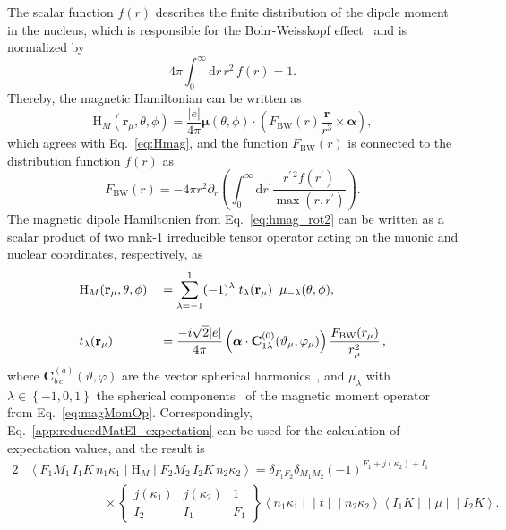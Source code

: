The scalar function $f(r)$ describes the finite distribution of the dipole moment in the nucleus, which is responsible for the Bohr-Weisskopf effect~\cite{bohrWeisskopf1950} and is normalized by
\begin{equation}
4\pi\int_0^\infty \text{d}r\,r^2\,f(r)=1.
\end{equation}
Thereby, the magnetic Hamiltonian can be written as
\begin{equation}
\label{eq:hmag_rot2}
\text{H}_M(\mathbf{r}_\mu,\theta,\phi) =\frac{|e|}{4\pi}\boldsymbol{\mu}(\theta,\phi)\cdot
\left( F_{\text{BW}}(r)\frac{\mathbf{r}}{r^3}\times \boldsymbol{\alpha}\right),
\end{equation}
which agrees with Eq.~\eqref{eq:Hmag}, and the function $F_{\text{BW}}(r)$ is connected to the distribution function $f(r)$ as
\begin{equation}
F_{\text{BW}}(r)=-4\pi r^2\partial_r \left(\int_0^\infty\text{d}r^\prime \frac{r^{\prime\,2}f(r^\prime)}{\max (r,r^\prime)}\right).
\end{equation}
The magnetic dipole Hamiltonien from Eq.~\eqref{eq:hmag_rot2} can be written as a scalar product of two rank-1 irreducible tensor operator acting on the muonic and nuclear coordinates, respectively, as~\cite{johnson2007}
\begin{alignat}{2}
&\text{H}_M  (\mathbf{r}_\mu,\theta,\phi) &&=\sum_{\lambda=-1}^1 (-1)^\lambda \;t_\lambda(\mathbf{r}_\mu) \;\;\mu_{-\lambda}(\theta,\phi),\notag\\[7.5pt]
&t_\lambda(\mathbf{r}_\mu) &&= \frac{-i\sqrt{2}|e|}{4\pi}\left(\boldsymbol{\alpha}\cdot\mathbf{C}^{(0)}_{1\lambda}(\vartheta_\mu,\varphi_\mu)\right)\frac{F_{\text{BW}}(r_\mu)}{r_\mu^2}\,\notag,
\end{alignat}
where $\mathbf{C}^{(a)}_{b\,c}(\vartheta,\varphi)$ are the vector spherical harmonics~\cite[Section 7.]{varshalovich1988}, and $\mu_\lambda$ with $\lambda \in \left\{-1,0,1\right\}$ the spherical components~\cite[Section 1.]{varshalovich1988} of the magnetic moment operator from Eq.~\eqref{eq:magMomOp}. Correspondingly, Eq.~\eqref{app:reducedMatEl_expectation} can be used for the calculation of expectation values, and the result is
\begin{alignat}{2}
& \left<F_1M_1\,I_1K\,n_1\kappa_1 \middle|\text{H}_M \middle|F_2M_2\,I_2K\,n_2\kappa_2 \right> = \delta_{F_1F_2}\delta_{M_1M_2}(-1)^{F_1+j(\kappa_2)+I_1}\\[7.5pt]
&\qquad\qquad\qquad\times
\begin{Bmatrix}
j(\kappa_1)&j(\kappa_2)&1\\
I_2&I_1&F_1
\end{Bmatrix}
\left< n_1\kappa_1\middle|\middle|t \middle|\middle| n_2\kappa_2\right>
\left< I_1K\middle|\middle|\mu \middle|\middle|I_2K\right>.
\end{alignat}
